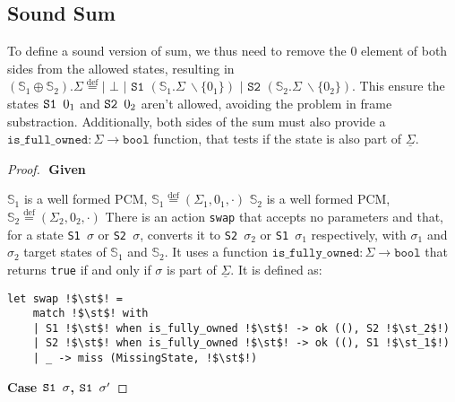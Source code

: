 \documentclass[,a4paper,oneside]{article}
\newcommand{\code}[1]{\texttt{#1}}
\newcommand{\defeq}[0]{\stackrel{\text{def}}=}
\newcommand{\mmdl}[0]{\ensuremath{\mathbb S}}
\newcommand{\rarr}[0]{\ensuremath{\rightarrow}}
\newcommand{\st}[0]{\sigma}
\begin{document}
\subsection{Sound Sum}

To define a sound version of sum, we thus need to remove the $0$ element of both sides from the allowed states, resulting in $(\mmdl_1 \oplus \mmdl_2).\Sigma \defeq \code{| }\bot \code{ | S1 } (\mmdl_1.\Sigma~ \backslash \{ 0_1\}) \code{ | S2 } (\mmdl_2.\Sigma~ \backslash \{0_2\})$. This ensure the states $\sone0_1$ and $\stwo0_2$ aren't allowed, avoiding the problem in frame substraction. Additionally, both sides of the sum must also provide a $\code{is\_full\_owned} : \Sigma \rarr \code{bool}$ function, that tests if the state is also part of $\underline\Sigma$.

\begin{proof}$ $\newline
	\textbf{Given } \begin{description}
		 $\mmdl_1$ is a well formed PCM, $\mmdl_1 \defeq (\Sigma_1, 0_1, \cdot)$
		 $\mmdl_2$ is a well formed PCM, $\mmdl_2 \defeq (\Sigma_2, 0_2, \cdot)$
		 There is an action \code{swap} that accepts no parameters and that, for a state \code{S1 $\st$} or \code{S2 $\st$}, converts it to \code{S2 $\st_2$} or \code{S1 $\st_1$} respectively, with $\st_1$ and $\st_2$ target states of $\mmdl_1$ and $\mmdl_2$. It uses a function ${\code{is\_fully\_owned} : \Sigma\rarr \code{bool}}$ that returns \code{true} if and only if $\st$ is part of $\underline\Sigma$. It is defined as: 
\begin{verbatim}
let swap !$\st$! =
	match !$\st$! with
	| S1 !$\st$! when is_fully_owned !$\st$! -> ok ((), S2 !$\st_2$!)
	| S2 !$\st$! when is_fully_owned !$\st$! -> ok ((), S1 !$\st_1$!)
	| _ -> miss (MissingState, !$\st$!)
\end{verbatim}
\end{description}

\textbf{Case $\sone\st$, $\sone\st'$}


\end{proof}
\end{document}
